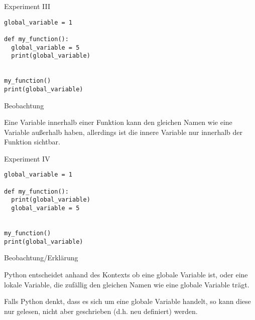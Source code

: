 \begin{fragile}

\begin{block}{Experiment III}
\vspace{2pt}

\begin{verbatim}
global_variable = 1

def my_function(): 
  global_variable = 5
  print(global_variable)


my_function()
print(global_variable)
\end{verbatim}
\vspace{12pt}

\end{block}

\begin{exampleblock}{Beobachtung}

\pause 

Eine Variable innerhalb einer Funktion kann den gleichen Namen wie eine Variable außerhalb haben, allerdings ist die innere Variable nur innerhalb der Funktion sichtbar. 
\end{exampleblock}


\end{fragile}


\begin{fragile}
	
\begin{block}{Experiment IV}
\vspace{2pt}

\begin{verbatim}
global_variable = 1

def my_function(): 
  print(global_variable)
  global_variable = 5


my_function()
print(global_variable)
\end{verbatim}
\vspace{12pt}

\end{block}

\begin{exampleblock}{Beobachtung/Erklärung}

\pause 

Python entscheidet anhand des Kontexts ob  eine globale Variable ist, oder eine lokale Variable, die zufällig den gleichen Namen wie eine globale Variable trägt. 

\pause 

Falls Python denkt, dass es sich um eine globale Variable handelt, so kann diese nur gelesen, nicht aber geschrieben (d.h. neu definiert) werden. 

\end{exampleblock}

	
\end{fragile}


